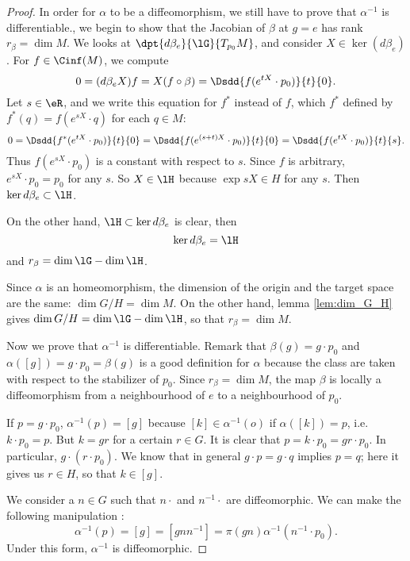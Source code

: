 \begin{proof}
In order for $\alpha$ to be a diffeomorphism, we still have to prove that $\alpha^{-1}$ is differentiable., we begin to show that the Jacobian of $\beta$ at $g=e$ has rank $r_{\beta}=\dim M$. We looks at $\dpt{d\beta_e}{\lG}{T_{p_0}M}$, and consider $X\in\ker (d\beta_e)$. For $f\in\Cinf(M)$, we compute
\begin{equation}
  0=(d\beta_e X)f=X(f\circ\beta)=\Dsdd{ f(e^{tX}\cdot p_0) }{t}{0}.
\end{equation}
Let $s\in\eR$, and we write this equation for $f^*$ instead of $f$, which $f^*$ defined by $f^*(q)=f(e^{sX}\cdot q)$ for each $q\in M$:
\begin{equation}
  0=\Dsdd{f^*(e^{tX}\cdot p_0)}{t}{0}
      =\Dsdd{ f(e^{(s+t)X}\cdot p_0) }{t}{0}
      =\Dsdd{ f(e^{tX}\cdot p_0) }{t}{s}.
\end{equation}
Thus $f(e^{sX}\cdot p_0)$ is a constant with respect to $s$. Since $f$ is arbitrary, $e^{sX}\cdot p_0=p_0$ for any $s$. So $X\in\lH$ because $\exp sX\in H$ for any $s$. Then $\ker d\beta_e\subset \lH$.

On the other hand, $\lH\subset\ker d\beta_e$ is clear, then
\[
   \ker d\beta_e=\lH
\]
and $r_{\beta}=\dim\lG-\dim\lH$.

Since $\alpha$ is an homeomorphism, the dimension of the origin and the target space are the same: $\dim G/H=\dim M$. On the other hand, lemma \ref{lem:dim_G_H} gives $\dim G/H=\dim\lG-\dim\lH$, so that $r_{\beta}=\dim M$.

Now we prove that $\alpha^{-1}$ is differentiable. Remark that $\beta(g)=g\cdot p_0$ and $\alpha([g])=g\cdot p_0=\beta(g)$ is a good definition for $\alpha$ because the class are taken with respect to the stabilizer of $p_0$. Since $r_{\beta}=\dim M$, the map $\beta$ is locally a diffeomorphism from a neighbourhood of $e$ to a neighbourhood of $p_0$.

If $p=g\cdot p_0$, $\alpha^{-1}(p)=[g]$ because $[k]\in\alpha^{-1}(o)$ if $\alpha([k])=p$, i.e. $k\cdot p_0=p$. But $k=gr$ for a certain $r\in G$. It is clear that $p=k\cdot p_0=gr\cdot p_0$. In particular, $g\cdot(r\cdot p_0)$. We know that in general $g\cdot p=g\cdot q$ implies $p=q$; here it gives us $r\in H$, so that $k\in [g]$.

We consider a $n\in G$ such that $n\cdot$ and $n^{-1}\cdot$ are diffeomorphic. We can make the following manipulation :
\begin{equation}
   \alpha^{-1}(p)=[g]
                =[gnn^{-1}]
		=\pi(gn)\alpha^{-1}(n^{-1}\cdot p_0).
\end{equation}
Under this form, $\alpha^{-1}$ is diffeomorphic.



\end{proof}
